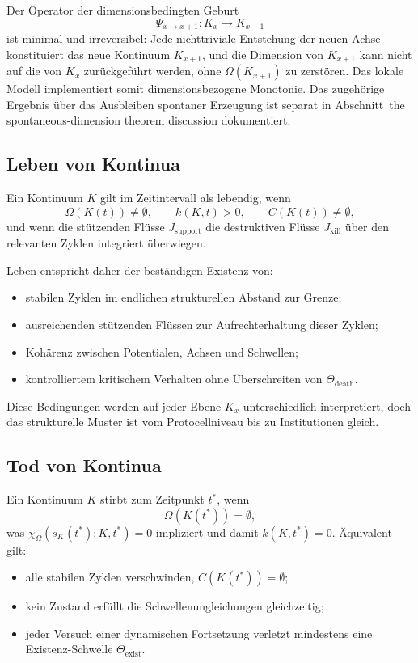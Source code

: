 Der Operator der dimensionsbedingten Geburt
\[
    \Psi_{x\to x+1}: K_x \to K_{x+1}
\]
ist minimal und irreversibel: Jede nichttriviale Entstehung der neuen Achse
konstituiert das neue Kontinuum \(K_{x+1}\), und die Dimension von
\(K_{x+1}\) kann nicht auf die von \(K_x\) zurückgeführt werden, ohne
\(\Omega(K_{x+1})\) zu zerstören.
Das lokale Modell implementiert somit dimensionsbezogene Monotonie. Das
zugehörige Ergebnis über das Ausbleiben spontaner Erzeugung ist separat in
Abschnitt~the spontaneous-dimension theorem discussion dokumentiert.

\subsection{Leben von Kontinua}

Ein Kontinuum \(K\) gilt im Zeitintervall als lebendig, wenn
\[
    \Omega(K(t)) \neq \emptyset,\qquad
    k(K,t) > 0,\qquad
    C(K(t)) \neq \emptyset,
\]
und wenn die stützenden Flüsse \(J_{\mathrm{support}}\) die destruktiven
Flüsse \(J_{\mathrm{kill}}\) über den relevanten Zyklen integriert überwiegen.

Leben entspricht daher der beständigen Existenz von:
\begin{itemize}
    \item stabilen Zyklen im endlichen strukturellen Abstand zur Grenze;
    \item ausreichenden stützenden Flüssen zur Aufrechterhaltung dieser Zyklen;
    \item Kohärenz zwischen Potentialen, Achsen und Schwellen;
    \item kontrolliertem kritischem Verhalten ohne Überschreiten von
          \(\Theta_{\mathrm{death}}\).
\end{itemize}

Diese Bedingungen werden auf jeder Ebene \(K_x\) unterschiedlich interpretiert,
doch das strukturelle Muster ist vom Protocellniveau bis zu Institutionen gleich.

\subsection{Tod von Kontinua}

Ein Kontinuum \(K\) stirbt zum Zeitpunkt \(t^\ast\), wenn
\[
    \Omega(K(t^\ast)) = \emptyset,
\]
was \(\chi_{\Omega}(s_K(t^\ast);K,t^\ast)=0\) impliziert und damit
\(k(K,t^\ast)=0\).
Äquivalent gilt:
\begin{itemize}
    \item alle stabilen Zyklen verschwinden, \(C(K(t^\ast)) = \emptyset\);
    \item kein Zustand erfüllt die Schwellenungleichungen gleichzeitig;
    \item jeder Versuch einer dynamischen Fortsetzung verletzt mindestens eine
          Existenz-Schwelle \(\Theta_{\mathrm{exist}}\).
\end{itemize}

